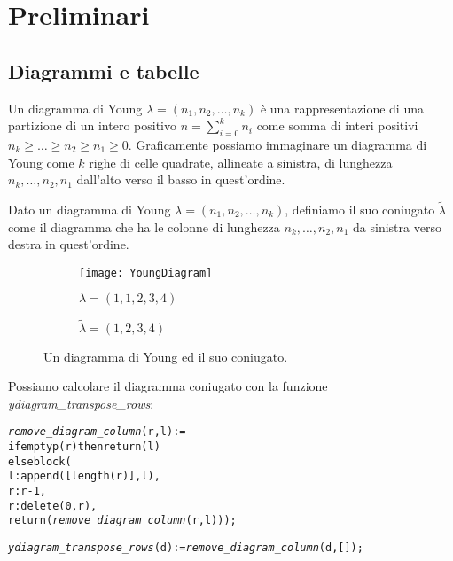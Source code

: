 \chapter{Preliminari}

\section{Diagrammi e tabelle}

\begin{defn}
Un diagramma di Young $\lambda=(n_1,n_2,\dots,n_k)$ \`e una
rappresentazione di una partizione di un intero positivo $n =
\sum_{i=0}^{k}{n_i}$ come somma di interi positivi $n_k \geq \ldots \geq
n_2 \geq n_1 \geq 0$. Graficamente possiamo immaginare un diagramma di
Young come $k$ righe di celle quadrate, allineate a sinistra, di
lunghezza $n_k,\ldots,n_2,n_1$ dall'alto verso il basso in quest'ordine.
\end{defn}

\begin{defn}
Dato un diagramma di Young $\lambda=(n_1,n_2,\dots,n_k)$, definiamo il
suo coniugato $\tilde{\lambda}$ come il diagramma che ha le colonne di
lunghezza $n_k,\ldots,n_2,n_1$ da sinistra verso destra in quest'ordine.  
\end{defn}

\begin{figure}[h]
\centering

\begin{subfigure}[b]{0.4\textwidth}
\centering
\texttt{[image: YoungDiagram]}
\caption{$\lambda=(1,1,2,3,4)$}
\end{subfigure}%
\begin{subfigure}[b]{0.4\textwidth}
\centering
{}
\caption{$\tilde{\lambda}=(1,2,3,4)$}
\end{subfigure}
\caption{Un diagramma di Young ed il suo coniugato.}
\end{figure}

Possiamo calcolare il diagramma coniugato con la funzione
\emph{ydiagram\_transpose\_rows}:

\begin{alltt}
\emph{remove\_diagram\_column} (r, l) := 
if emptyp (r) then return (l)
else block (
  l : append ([length (r)], l),
  r : r-1,
  r : delete (0, r),
  return (\emph{remove\_diagram\_column} (r, l)));

\emph{ydiagram\_transpose\_rows} (d) := \emph{remove\_diagram\_column} (d, []);
\end{alltt}

